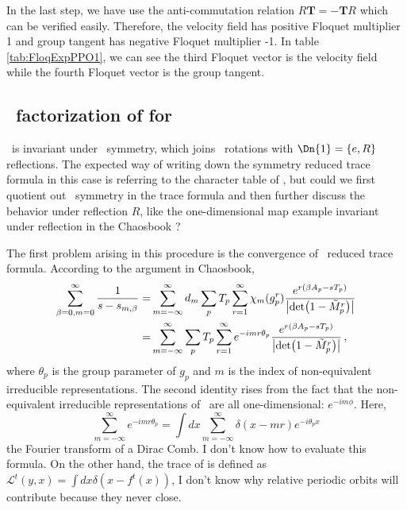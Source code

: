 In the last step, we have use the anti-commutation relation
$R\mathbf{T}=-\mathbf{T}R$ which can be verified easily. Therefore,
the velocity field has positive Floquet multiplier 1 and group
tangent has negative Floquet multiplier -1. In table
\ref{tab:FloqExpPPO1}, we can see the third Floquet vector is
the velocity field while the fourth Floquet vector is the group tangent.

\subsection{\ factorization of {\Fd} for \KSe }

\KSe\ is invariant under \ symmetry, which joins \ rotations
with $\Dn{1}=\{e,R\}$ reflections. The expected way of writing down the
symmetry reduced trace formula in this case is referring to
the character table of , but could we first quotient out
\ symmetry in the trace formula and then further discuss the
behavior under reflection $R$, like the one-dimensional map
example
invariant under reflection in the Chaosbook ?

The first problem arising in this procedure is the convergence
of \ reduced trace formula. According to the argument in
Chaosbook,
\begin{align*}
  \sum_{\beta=0,m=0}^{\infty}\frac{1}{s-s_{m,\beta}}
  = & \sum_{m=-\infty}^{\infty}d_{m} \sum_p T_{p}\sum_{r=1}^{\infty}
    \chi_{m}( g_p^r)
{
 e^{r (\beta A_{p}-sT_{p})}
  \over
 {\left|\det\!\left(1-\tilde{M}_{p}^r\right)\right|}
} \\
    = & \sum_{m=-\infty}^{\infty} \sum_p T_{p}\sum_{r=1}^{\infty} e^{-imr\theta_{p}}
{
 e^{r (\beta A_{p}-sT_{p})}
  \over
 {\left|\det\!\left(1-\tilde{M}_{p}^r\right)\right|}
}
\,,
\end{align*}
where $\theta_{p}$ is the group parameter of $g_{p}$ and $m$ is the
index of non-equivalent irreducible representations.
The second identity rises from the fact that the non-equivalent
irreducible representations of \ are all one-dimensional:
$e^{-im\phi}$. Here,
\[
\sum_{m=-\infty}^{\infty}e^{-imr\theta_{p}}=
\int dx \sum_{m=-\infty}^{\infty}\delta(x-mr)e^{-i\theta_{p} x}
\]
the Fourier transform of a Dirac Comb. I
don't know how to evaluate this formula. On the other hand,
the trace of {\evOper} is defined as
$\mathcal{L}^{t}(y,x)=\int dx \delta(x-f^{t}(x))$, I don't know
why relative periodic orbits will contribute because they
never close.

